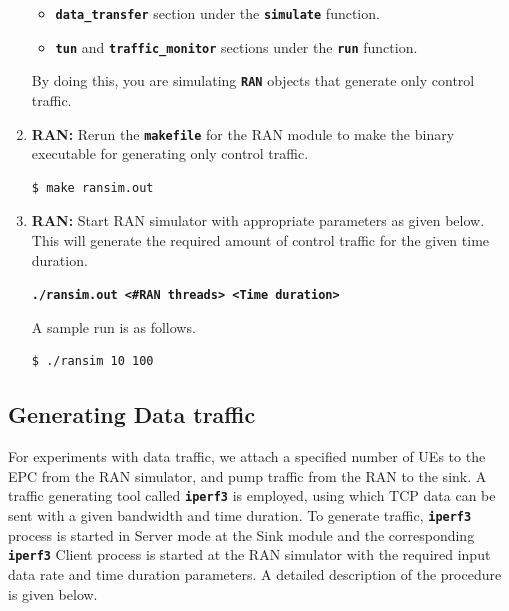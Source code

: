 \pdfminorversion=4\documentclass[hidelinks]{report}
\newcommand{\cf}[1] {
	\textbf{\texttt{#1}}
}
\begin{document}
\begin{enumerate}
\begin{itemize}

\item \cf{data\_transfer} section under the \cf{simulate} function.

\item \cf{tun} and \cf{traffic\_monitor} sections under the \cf{run} function.

\end{itemize}

By doing this, you are simulating \cf{RAN} objects that generate only control traffic.

\item \textbf{RAN:} Rerun the \cf{makefile} for the RAN module to make the binary executable for generating only control traffic.

\begin{lstlisting}[language=bash]
$ make ransim.out
\end{lstlisting}

\item \textbf{RAN:} Start RAN simulator with appropriate parameters as given below. This will generate the required amount of control traffic for the given time duration.

\begin{center}

\cf{./ransim.out <\#RAN threads> <Time duration>}

\end{center}

A sample run is as follows.

\begin{lstlisting}[language=bash]
$ ./ransim 10 100
\end{lstlisting}

\end{enumerate}


\subsection*{Generating Data traffic}

For experiments with data traffic, we attach a specified number of UEs to the EPC from the RAN simulator, and pump traffic from the RAN to the sink. A traffic generating tool called \cf{iperf3} is employed, using which TCP data can be sent with a given bandwidth and time duration. To generate traffic, \cf{iperf3} process is started in Server mode at the Sink module and the corresponding \cf{iperf3} Client process is started at the RAN simulator with the required input data rate and time duration parameters. A detailed description of the procedure is given below.
\end{document}
